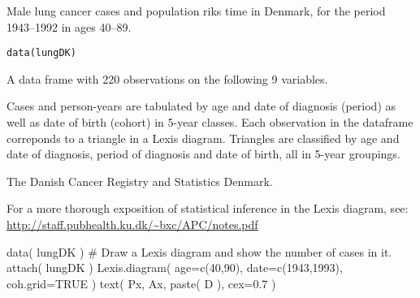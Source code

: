 \begin{Description}\relax
Male lung cancer cases and population riks time in Denmark, for the
period 1943--1992 in ages 40--89.
\end{Description}
\begin{Usage}
\begin{verbatim}data(lungDK)\end{verbatim}
\end{Usage}
\begin{Format}\relax
A data frame with 220 observations on the following 9 variables.
\end{Format}
\begin{Details}\relax
Cases and person-years are tabulated by age and date of
diagnosis (period) as well as date of birth (cohort) in 5-year
classes. Each observation in the dataframe correponds to a triangle in
a Lexis diagram. Triangles are classified by age and date of
diagnosis, period of diagnosis and date of birth, all in 5-year
groupings.
\end{Details}
\begin{Source}\relax
The Danish Cancer Registry and Statistics Denmark.
\end{Source}
\begin{References}\relax
For a more thorough exposition of statistical inference in the Lexis
diagram, see: \url{http://staff.pubhealth.ku.dk/~bxc/APC/notes.pdf}
\end{References}
\begin{Examples}
\begin{ExampleCode}
data( lungDK )
# Draw a Lexis diagram and show the number of cases in it.
attach( lungDK )
Lexis.diagram( age=c(40,90), date=c(1943,1993), coh.grid=TRUE )
text( Px, Ax, paste( D ), cex=0.7 )
\end{ExampleCode}
\end{Examples}

